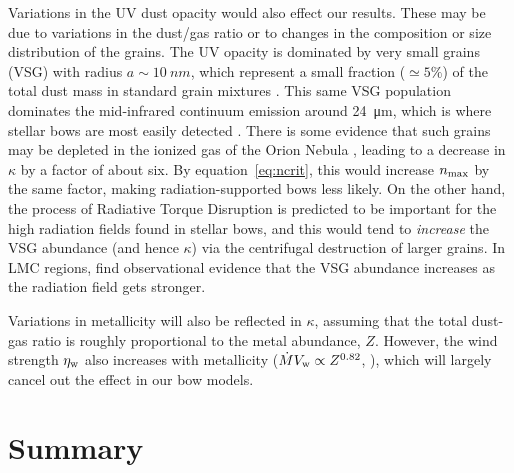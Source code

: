 Variations in the UV dust opacity would also effect our results.
These may be due to variations in the dust/gas ratio or to changes in
the composition or size distribution of the grains.  The UV opacity is
dominated by very small grains (VSG) with radius
\(a \sim \SI{10}{nm}\), which represent a small fraction
(\(\simeq 5\%\)) of the total dust mass in standard grain mixtures
\citep{Desert:1990a}.  This same VSG population dominates the
mid-infrared continuum emission around \SI{24}{\um}, which is where
stellar bows are most easily detected \citep{Meyer:2016a,
  Kobulnicky:2016a}. There is some evidence that such grains may be
depleted in the ionized gas of the Orion Nebula \citep{Salgado:2016a},
leading to a decrease in \(\kappa\) by a factor of about six.  By
equation~\eqref{eq:ncrit}, this would increase \(n_{\text{max}}\) by the same
factor, making radiation-supported bows less likely.  On the other
hand, the process of Radiative Torque Disruption is predicted to be
important \citep{Hoang:2018a} for the high radiation fields found in
stellar bows, and this would tend to \emph{increase} the VSG abundance
(and hence \(\kappa\)) via the centrifugal destruction of larger grains.
In LMC \hii{} regions, \citet{Stephens:2014b} find observational
evidence that the VSG abundance increases as the radiation field gets
stronger.

Variations in metallicity will also be reflected in \(\kappa\), assuming
that the total dust-gas ratio is roughly proportional to the metal
abundance, \(Z\).  However, the wind strength \(\eta_{\text{w}}\) also
increases with metallicity (\(\dot{M} V_{\text{w}} \propto Z^{0.82}\),
\citealp{Vink:2001a}), which will largely cancel out the effect in our
bow models.





\section{Summary}
\label{sec:summary}

